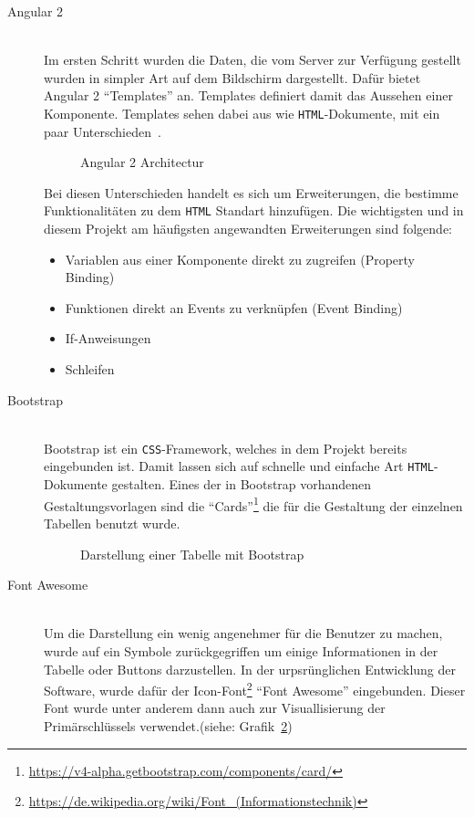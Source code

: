 \begin{description}
\item[Angular 2] \hfill\\
Im ersten Schritt wurden die Daten, die vom Server zur Verfügung gestellt wurden in simpler Art auf dem Bildschirm dargestellt. 
Dafür bietet Angular 2 ``Templates'' an. Templates definiert damit das Aussehen einer Komponente. Templates sehen dabei aus wie \texttt{HTML}-Dokumente, mit ein paar Unterschieden~\cite{angular2_flow}.

\begin{figure}[ht]
    \centering
    \caption{Angular 2 Architectur}
    \label{pic:angular2_architecture}
\end{figure}

Bei diesen Unterschieden handelt es sich um Erweiterungen, die bestimme Funktionalitäten zu dem \texttt{HTML} Standart hinzufügen. Die wichtigsten und in diesem Projekt am häufigsten angewandten Erweiterungen sind folgende:
\begin{itemize}
\item Variablen aus einer Komponente direkt zu zugreifen (Property Binding)
\item Funktionen direkt an Events zu verknüpfen (Event Binding)
\item If-Anweisungen 
\item Schleifen
\end{itemize} 


\item[Bootstrap] \hfill\\
Bootstrap ist ein \texttt{CSS}-Framework, welches in dem Projekt bereits eingebunden ist. Damit lassen sich auf schnelle und einfache Art \texttt{HTML}-Dokumente gestalten. 
Eines der in Bootstrap vorhandenen Gestaltungsvorlagen sind die ``Cards''\footnote{\url{https://v4-alpha.getbootstrap.com/components/card/}} die für die Gestaltung der einzelnen Tabellen benutzt wurde.

\begin{figure}[ht]
    \centering
    \caption{Darstellung einer Tabelle mit Bootstrap}
    \label{pic:table_boot}
\end{figure}

\item[Font Awesome] \hfill\\
Um die Darstellung ein wenig angenehmer für die Benutzer zu machen, wurde auf ein Symbole zurückgegriffen um einige Informationen in der Tabelle oder Buttons darzustellen. In der urpsrünglichen Entwicklung der Software, wurde dafür der Icon-Font\footnote{\url{https://de.wikipedia.org/wiki/Font_(Informationstechnik)}} ``Font Awesome'' eingebunden. Dieser Font wurde unter anderem dann auch zur Visuallisierung der Primärschlüssels verwendet.(siehe: Grafik~\ref{pic:table_boot})%


\end{description}
